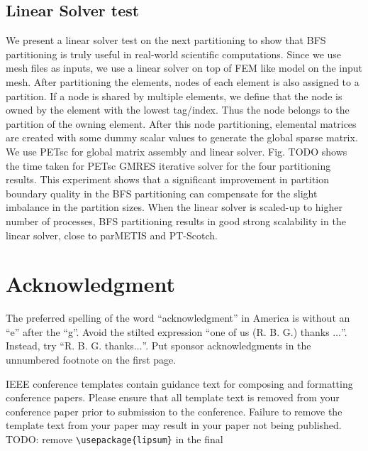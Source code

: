 \documentclass[conference]{IEEEtran}
\begin{document}
\subsection{Linear Solver test}
We present a linear solver test on the next partitioning to show that BFS partitioning is truly useful in real-world scientific computations. Since we use mesh files as inputs, we use a linear solver on top of FEM like model on the input mesh. After partitioning the elements, nodes of each element is also assigned to a partition. If a node is shared by multiple elements, we define that the node is owned by the element with the lowest tag/index. Thus the node belongs to the partition of the owning element. After this node partitioning, elemental matrices are created with some dummy scalar values to generate the global sparse matrix. We use PETsc \cite{petsc-web-page} for global matrix assembly and linear solver. Fig. TODO shows the time taken for PETsc GMRES \cite{GMRES} iterative solver for the four partitioning results. This experiment shows that a significant improvement in partition boundary quality in the BFS partitioning can compensate for the slight imbalance in the partition sizes. When the linear solver is scaled-up to higher number of processes, BFS partitioning results in good strong scalability in the linear solver, close to parMETIS and PT-Scotch. 




\section*{Acknowledgment}

The preferred spelling of the word ``acknowledgment'' in America is without 
an ``e'' after the ``g''. Avoid the stilted expression ``one of us (R. B. 
G.) thanks $\ldots$''. Instead, try ``R. B. G. thanks$\ldots$''. Put sponsor 
acknowledgments in the unnumbered footnote on the first page.






\vspace{12pt}
\color{red}
IEEE conference templates contain guidance text for composing and formatting conference papers. Please ensure that all template text is removed from your conference paper prior to submission to the conference. Failure to remove the template text from your paper may result in your paper not being published.
\\
TODO: remove \verb|\usepackage{lipsum}| in the final
\end{document}
